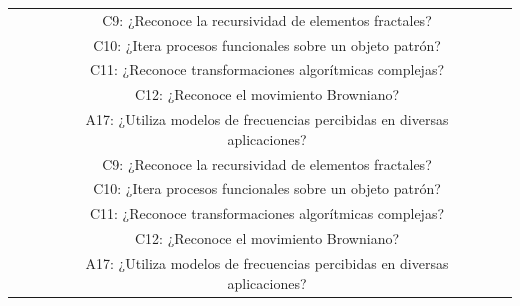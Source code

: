 \documentclass[12pt,a4paper]{article}
\begin{document}
\begin{landscape}
\begin{table}[ht!]
\begin{tabular}{cccccc}
						 			&\multirow{5}{*}{\makecell[{{M{2cm}}}]{\dimiii}} 		
				& \multirow{2}{*}{\gbbbbbb}&
				C9: ¿Reconoce la recursividad de elementos fractales?\\ \cline{4-4}				&&& 
				C10: ¿Itera procesos funcionales sobre un objeto patrón?       &\\\cline{3-4} 			&&\multirow{1}{*}{\gbbbbbbb}&
				C11: ¿Reconoce transformaciones algorítmicas complejas?       &\\\cline{3-4} 			&&\multirow{2}{*}{\gbbbbbbbb}&
				C12: ¿Reconoce el movimiento Browniano?\\ \cline{4-4}					&&&
				A17: ¿Utiliza modelos de frecuencias percibidas en diversas aplicaciones?       &\\ 	
				\cline{2-4}	
				
						 			&\multirow{5}{*}{\makecell[{{M{2cm}}}]{\dimiiii}} 		
				& \multirow{2}{*}{\gbbbbbb}&
				C9: ¿Reconoce la recursividad de elementos fractales?\\ \cline{4-4}				&&& 
				C10: ¿Itera procesos funcionales sobre un objeto patrón?       &\\\cline{3-4} 			&&\multirow{1}{*}{\gbbbbbbb}&
				C11: ¿Reconoce transformaciones algorítmicas complejas?       &\\\cline{3-4} 			&&\multirow{2}{*}{\gbbbbbbbb}&
				C12: ¿Reconoce el movimiento Browniano?\\ \cline{4-4}					&&&
				A17: ¿Utiliza modelos de frecuencias percibidas en diversas aplicaciones?       &\\\hline 	 	
			\end{tabular} 
		\end{table}
\end{landscape}
\end{document}
